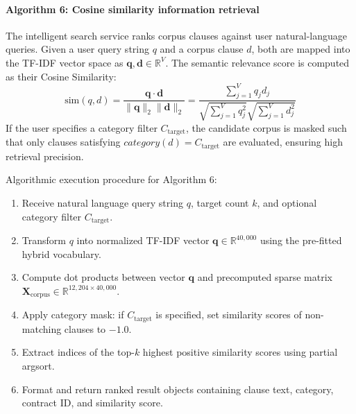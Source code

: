 \paragraph*{Algorithm 6: Cosine similarity information retrieval}
The intelligent search service ranks corpus clauses against user natural-language queries. Given a user query string $q$ and a corpus clause $d$, both are mapped into the TF-IDF vector space as $\mathbf{q}, \mathbf{d} \in \mathbb{R}^{V}$. The semantic relevance score is computed as their Cosine Similarity:
\begin{equation}
    \text{sim}(q, d) = \frac{\mathbf{q} \cdot \mathbf{d}}{\|\mathbf{q}\|_2 \|\mathbf{d}\|_2} = \frac{\sum_{j=1}^{V} q_j d_j}{\sqrt{\sum_{j=1}^{V} q_j^2} \sqrt{\sum_{j=1}^{V} d_j^2}}
    \label{eq:cosine_sim}
\end{equation}
If the user specifies a category filter $C_{\text{target}}$, the candidate corpus is masked such that only clauses satisfying $category(d) = C_{\text{target}}$ are evaluated, ensuring high retrieval precision.

\noindent Algorithmic execution procedure for Algorithm 6:
\begin{enumerate}
    \item Receive natural language query string $q$, target count $k$, and optional category filter $C_{\text{target}}$.
    \item Transform $q$ into normalized TF-IDF vector $\mathbf{q} \in \mathbb{R}^{40,000}$ using the pre-fitted hybrid vocabulary.
    \item Compute dot products between vector $\mathbf{q}$ and precomputed sparse matrix $\mathbf{X}_{\text{corpus}} \in \mathbb{R}^{12,204 \times 40,000}$.

    \item Apply category mask: if $C_{\text{target}}$ is specified, set similarity scores of non-matching clauses to $-1.0$.
    \item Extract indices of the top-$k$ highest positive similarity scores using partial argsort.
    \item Format and return ranked result objects containing clause text, category, contract ID, and similarity score.
\end{enumerate}

